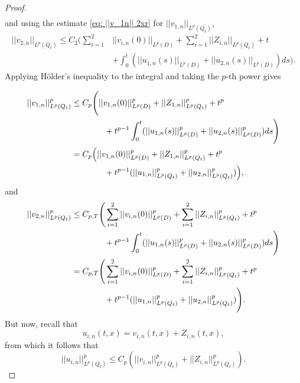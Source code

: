 \documentclass[12pt]{article}
\theoremstyle{definition}
\theoremstyle{remark}
\begin{document}
\begin{proof}
\begin{equation}
\begin{aligned}
\end{aligned}
\end{equation}
and using the estimate \eqref{eq: ||v_1n|| 2xr} for $||v_{1,n}||_{L^p(Q_t)}$,
\begin{equation}\label{eq: ||v_2,n|| 2xr}
\begin{aligned}
||v_{2,n}||_{L^p(Q_t)}\leq C_2\Bigg( \sum_{i=1}^2 &||v_{i,n}(0)||_{L^p(D)}+\sum_{i=1}^2 ||Z_{i,n}||_{L^p(Q_t)}+t\\
&+\int_0^t (||u_{1,n}(s)||_{L^p(D)}+||u_{2,n}(s)||_{L^p(D)})ds\Bigg).
\end{aligned}
\end{equation}
Applying H\"older's inequality to the integral and taking the $p$-th power gives

\begin{align}
||v_{1,n}||^p_{L^p(Q_t)} &\leq C_{p}\Bigg( ||v_{1,n}(0)||^p_{L^p(D)}+||Z_{1,n}||^p_{L^p(Q_t)}+t^p\notag\\
&\qquad\qquad+t^{p-1}\int_0^t (||u_{1,n}(s)||^p_{L^p(D)}+||u_{2,n}(s)||^p_{L^p(D)})ds\Bigg)\notag\\
&=C_{p}\Big( ||v_{1,n}(0)||^p_{L^p(D)}+||Z_{1,n}||^p_{L^p(Q_t)}+t^p\notag\\
&\qquad\qquad+t^{p-1}(||u_{1,n}||_{L^p(Q_t)}^p+||u_{2,n}||_{L^p(Q_t)}^p)\Big)\label{eq: b||v 1n||},
\end{align}
and
\begin{align}
||v_{2,n}||^p_{L^p(Q_t)} &\leq C_{p,T}\Bigg(\sum_{i=1}^2 ||v_{i,n}(0)||^p_{L^p(D)}+\sum_{i=1}^2||Z_{i,n}||_{L^p(Q_t)}^p+t^p\notag\\
&\qquad\qquad+t^{p-1}\int_0^t (||u_{1,n}(s)||^p_{L^p(D)}+||u_{2,n}(s)||^p_{L^p(D)})ds\Bigg)\notag\\
&= C_{p,T}\Bigg(\sum_{i=1}^2 ||v_{i,n}(0)||^p_{L^p(D)}+\sum_{i=1}^2||Z_{i,n}||_{L^p(Q_t)}^p+t^p\notag\\
&\qquad\qquad+t^{p-1}(||u_{1,n}||_{L^p(Q_t)}^p+||u_{2,n}||_{L^p(Q_t)}^p)\Bigg).\label{eq: b||v_2n||}
\end{align}
But now, recall that
\[
u_{i,n}(t,x) = v_{i,n}(t,x) + Z_{i,n}(t,x),
\]
from which it follows that
\begin{equation}\label{eq: b||u_in||}
||u_{i,n}||_{L^p(Q_t)}^p\leq C_p\left(||v_{i,n}||^p_{L^p(Q_t)}+||Z_{i,n}||^p_{L^p(Q_t)}\right).
\end{equation}

\end{proof}
\end{document}

